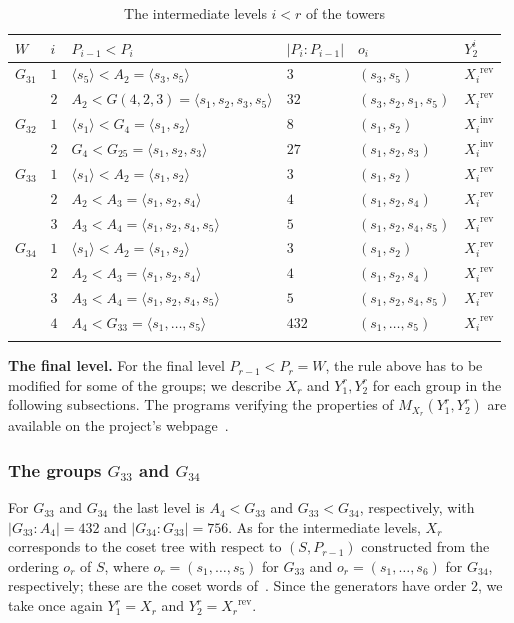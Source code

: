 \documentclass[11pt, reqno]{amsart}
\newcommand{\wrev}[1]{{#1}^{\mathrm{rev}}}
\newcommand{\winv}[1]{{#1}^{\mathrm{inv}}}
\numberwithin{equation}{section}
\theoremstyle{remark}
\begin{document}
\begin{table}[h]
	\centering
	\renewcommand{\arraystretch}{1.6}
	\begin{tabular}{llllll}
		$W$ & $i$ & $P_{i-1}<P_i$ & $|P_i:P_{i-1}|$ & $o_i$ & $Y^i_2$ \\
		\hline
		$G_{31}$ & $1$ & $\langle s_5\rangle<A_2=\langle s_3,s_5\rangle$ & $3$ & $(s_3,s_5)$ & $\wrev{X_i}$ \\
		& $2$ & $A_2<G(4,2,3)=\langle s_1,s_2,s_3,s_5\rangle$ & $32$ & $(s_3,s_2,s_1,s_5)$ & $\wrev{X_i}$ \\
		\hline
		$G_{32}$ & $1$ & $\langle s_1\rangle<G_4=\langle s_1,s_2\rangle$ & $8$ & $(s_1,s_2)$ & $\winv{X_i}$ \\
		& $2$ & $G_4<G_{25}=\langle s_1,s_2,s_3\rangle$ & $27$ & $(s_1,s_2,s_3)$ & $\winv{X_i}$ \\
		\hline
		$G_{33}$ & $1$ & $\langle s_1\rangle<A_2=\langle s_1,s_2\rangle$ & $3$ & $(s_1,s_2)$ & $\wrev{X_i}$ \\
		& $2$ & $A_2<A_3=\langle s_1,s_2,s_4\rangle$ & $4$ & $(s_1,s_2,s_4)$ & $\wrev{X_i}$ \\
		& $3$ & $A_3<A_4=\langle s_1,s_2,s_4,s_5\rangle$ & $5$ & $(s_1,s_2,s_4,s_5)$ & $\wrev{X_i}$ \\
		\hline
		$G_{34}$ & $1$ & $\langle s_1\rangle<A_2=\langle s_1,s_2\rangle$ & $3$ & $(s_1,s_2)$ & $\wrev{X_i}$ \\
		& $2$ & $A_2<A_3=\langle s_1,s_2,s_4\rangle$ & $4$ & $(s_1,s_2,s_4)$ & $\wrev{X_i}$ \\
		& $3$ & $A_3<A_4=\langle s_1,s_2,s_4,s_5\rangle$ & $5$ & $(s_1,s_2,s_4,s_5)$ & $\wrev{X_i}$ \\
		& $4$ & $A_4<G_{33}=\langle s_1,\dots,s_5\rangle$ & $432$ & $(s_1,\dots,s_5)$ & $\wrev{X_i}$ \\
		& & & & &\\
	\end{tabular}
	\caption{The intermediate levels $i<r$ of the towers}
	\label{tab:towers}
\end{table}

\noindent\textbf{The final level.} For the final level $P_{r-1}<P_r=W$, the rule above has to be modified for some of the groups; we describe $X_r$ and $Y^r_1,Y^r_2$ for each group in the following subsections. The programs verifying the properties of $M_{X_r}(Y^r_1,Y^r_2)$ are available on the project's webpage~\cite{web}.

\subsubsection{The groups $G_{33}$ and $G_{34}$}\label{g3334}
For $G_{33}$ and $G_{34}$ the last level is $A_4<G_{33}$ and $G_{33}<G_{34}$, respectively, with $|G_{33}:A_4|=432$ and $|G_{34}:G_{33}|=756$. As for the intermediate levels, $X_r$ corresponds to the coset tree with respect to $(S,P_{r-1})$ constructed from the ordering $o_r$ of $S$, where $o_r=(s_1,\dots,s_5)$ for $G_{33}$ and $o_r=(s_1,\dots,s_6)$ for $G_{34}$, respectively; these are the coset words of~\cite{MaPf}. Since the generators have order $2$, we take once again  $Y^r_1=X_r$ and $Y^r_2=\wrev{X_r}$.
\end{document}
